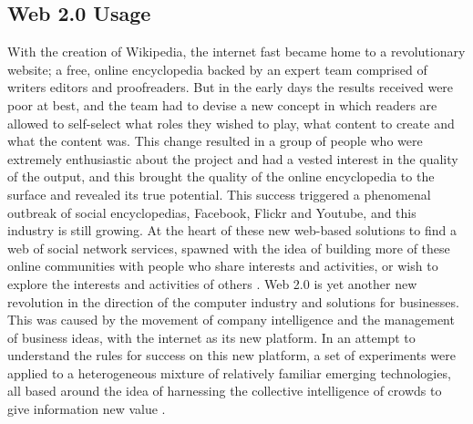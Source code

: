 \subsection{Web 2.0 Usage}

With the creation of Wikipedia, the internet fast became home to a revolutionary website; a free, online encyclopedia backed by an expert team comprised of writers editors and proofreaders. But in the early days the results received were poor at best, and the team had to devise a new concept in which readers are allowed to self-select what roles they wished to play, what content to create and what the content was. This change resulted in a group of people who were extremely enthusiastic about the project and had a vested interest in the quality of the output, and this brought the quality of the online encyclopedia to the surface and revealed its true potential. This success triggered a phenomenal outbreak of social encyclopedias, Facebook, Flickr and Youtube, and this industry is still growing. At the heart of these new web-based solutions to find a web of social network services, spawned with the idea of building more of these online communities with people who share interests and activities, or wish to explore the interests and activities of others \cite{kamel2007emerging}. Web 2.0 is yet another new revolution in the direction of the computer industry and solutions for businesses. This was caused by the movement of company intelligence and the management of business ideas, with the internet as its new platform. In an attempt to understand the rules for success on this new platform, a set of experiments were applied to a heterogeneous mixture of relatively familiar emerging technologies, all based around the idea of harnessing the collective intelligence of crowds to give information new value \cite{webtim}. 

